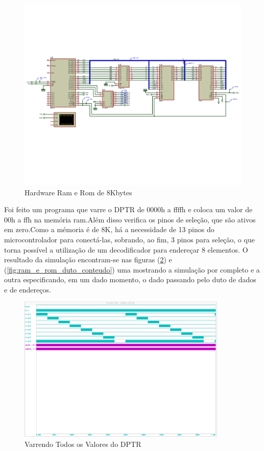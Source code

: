 \documentclass{Fabiano_file}
\begin{document}
\begin{figure}[h!]
\centering
\includegraphics[width=1\textwidth]{ram_rom.pdf}
\caption{Hardware Ram e Rom de 8Kbytes}
\label{fig:ram_rom}
\end{figure}

Foi feito um programa que varre o DPTR de 0000h a ffffh e coloca um valor de 00h a ffh na memória ram.Além disso verifica os pinos de seleção, que são ativos em 
zero.Como a mémoria é de 8K, há a necessidade de 13 pinos do microcontrolador para conectá-las, sobrando, ao fim, 3 pinos para seleção, o que torna possível a 
utilização de um decodificador para endereçar 8 elementos. O resultado da simulação encontram-se nas figuras (\ref{fig:ram_rom_varrendo_tudo}) 
e (\ref{fig:ram_e_rom_duto_conteudo}) uma mostrando a simulação por completo e a outra especificando, em um dado momento, o dado passando pelo duto de dados 
e de endereços.

\newpage

\begin{figure}[h!]
\centering
\includegraphics[width=0.89\textwidth]{ram_rom_varrendo_tudo.pdf}
\caption{Varrendo Todos os Valores do DPTR}
\label{fig:ram_rom_varrendo_tudo}
\end{figure}
\end{document}
